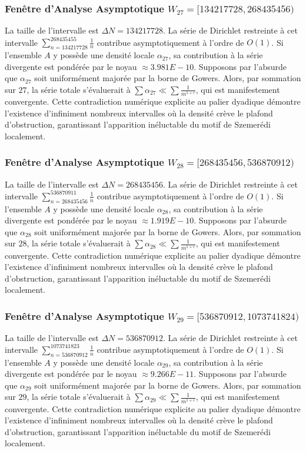 \documentclass[11pt,a4paper]{article}
\begin{document}
\subsubsection{Fenêtre d'Analyse Asymptotique $W_{27} = [134217728, 268435456)$}
La taille de l'intervalle est $\Delta N = 134217728$. La série de Dirichlet restreinte à cet intervalle $\sum_{n=134217728}^{268435455} \frac{1}{n}$ contribue asymptotiquement à l'ordre de $O(1)$. Si l'ensemble $A$ y possède une densité locale $\alpha_{27}$, sa contribution à la série divergente est pondérée par le noyau $\approx 3.981E-10$. Supposons par l'absurde que $\alpha_{27}$ soit uniformément majorée par la borne de Gowers. Alors, par sommation sur $27$, la série totale s'évaluerait à $\sum \alpha_{27} \ll \sum \frac{1}{m^{1+\epsilon}}$, qui est manifestement convergente. Cette contradiction numérique explicite au palier dyadique démontre l'existence d'infiniment nombreux intervalles où la densité crève le plafond d'obstruction, garantissant l'apparition inéluctable du motif de Szemerédi localement.
\subsubsection{Fenêtre d'Analyse Asymptotique $W_{28} = [268435456, 536870912)$}
La taille de l'intervalle est $\Delta N = 268435456$. La série de Dirichlet restreinte à cet intervalle $\sum_{n=268435456}^{536870911} \frac{1}{n}$ contribue asymptotiquement à l'ordre de $O(1)$. Si l'ensemble $A$ y possède une densité locale $\alpha_{28}$, sa contribution à la série divergente est pondérée par le noyau $\approx 1.919E-10$. Supposons par l'absurde que $\alpha_{28}$ soit uniformément majorée par la borne de Gowers. Alors, par sommation sur $28$, la série totale s'évaluerait à $\sum \alpha_{28} \ll \sum \frac{1}{m^{1+\epsilon}}$, qui est manifestement convergente. Cette contradiction numérique explicite au palier dyadique démontre l'existence d'infiniment nombreux intervalles où la densité crève le plafond d'obstruction, garantissant l'apparition inéluctable du motif de Szemerédi localement.
\subsubsection{Fenêtre d'Analyse Asymptotique $W_{29} = [536870912, 1073741824)$}
La taille de l'intervalle est $\Delta N = 536870912$. La série de Dirichlet restreinte à cet intervalle $\sum_{n=536870912}^{1073741823} \frac{1}{n}$ contribue asymptotiquement à l'ordre de $O(1)$. Si l'ensemble $A$ y possède une densité locale $\alpha_{29}$, sa contribution à la série divergente est pondérée par le noyau $\approx 9.266E-11$. Supposons par l'absurde que $\alpha_{29}$ soit uniformément majorée par la borne de Gowers. Alors, par sommation sur $29$, la série totale s'évaluerait à $\sum \alpha_{29} \ll \sum \frac{1}{m^{1+\epsilon}}$, qui est manifestement convergente. Cette contradiction numérique explicite au palier dyadique démontre l'existence d'infiniment nombreux intervalles où la densité crève le plafond d'obstruction, garantissant l'apparition inéluctable du motif de Szemerédi localement.
\end{document}
